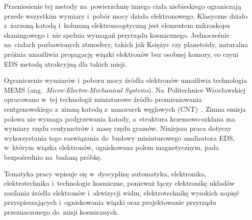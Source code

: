 Przeniesienie tej metody na~powierzchnię innego ciała niebieskiego
ograniczają przede wszystkim wymiary i~pobór mocy działa elektronowego.
Klasyczne działo z~żarzoną katodą i~kolumną elektronooptyczną jest
elementem mikroskopu skaningowego i~nie spełnia wymagań przyrządu
kosmicznego. Jednocześnie na~ciałach pozbawionych atmosfery, takich jak
Księżyc czy planetoidy, naturalna próżnia umożliwia propagację wiązki
elektronów bez osobnej komory, co czyni EDS metodą atrakcyjną dla
takich misji.

Ograniczenie wymiarów i~poboru mocy źródła elektronów umożliwia
technologia MEMS (ang.~\textit{Micro-Electro-Mechanical Systems}).
Na~Politechnice Wrocławskiej opracowano w~tej technologii miniaturowe
źródło promieniowania rentgenowskiego z~zimną katodą z~nanorurek
węglowych (CNT)~\cite{TODO-urbanski}. Zimna emisja polowa nie wymaga
podgrzewania katody, a~struktura krzemowo-szklana ma wymiary rzędu
centymetrów i~masę rzędu gramów. Niniejsza praca dotyczy wykorzystania
tego rozwiązania do~budowy miniaturowego analizatora EDS, w~którym
wiązka elektronów, ogniskowana polem magnetycznym, pada bezpośrednio
na~badaną próbkę.

Tematyka pracy wpisuje się w~dyscyplinę automatyka, elektronika,
elektrotechnika i~technologie kosmiczne, ponieważ łączy elektronikę
układów zasilania źródła elektronów i~akwizycji widm, elektrotechnikę
wysokich napięć przyspieszających i~ogniskowania wiązki oraz
projektowanie przyrządu przeznaczonego do~misji kosmicznych.
